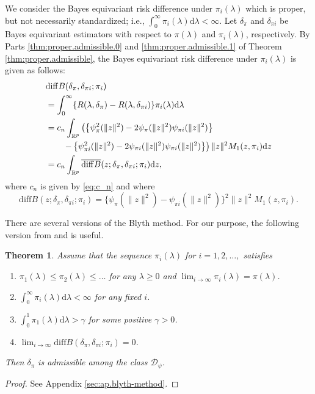 \documentclass[preprint,11pt]{imsart}
\numberwithin{equation}{section}
\theoremstyle{plain}
\newtheorem{thm}{Theorem}[section]
\theoremstyle{definition}
\theoremstyle{remark}
\newcommand{\rd}{\mathrm{d}}
\newcommand{\oldiff}{\overline{\mathrm{diff}B}}
\newcommand{\ndiff}{\mathrm{diff}B}
\newcommand{\dps}{\displaystyle}
\begin{document}
We consider the Bayes equivariant risk difference under $\pi_i(\lambda)$
which is proper, but not necessarily standardized; i.e., $\int_0^\infty \pi_i(\lambda) \rd \lambda <\infty$.
Let $\delta_\pi$ and $\delta_{\pi i}$ be Bayes equivariant estimators with respect to
$\pi(\lambda)$ and $\pi_i(\lambda)$, respectively.
By Parts \ref{thm:proper.admissible.0} and \ref{thm:proper.admissible.1} of Theorem \ref{thm:proper.admissible}, 
the Bayes equivariant risk difference under $\pi_i(\lambda)$ is given as follows:
\begin{align}
& \ndiff(\delta_\pi,\delta_{\pi i};\pi_i) \label{eq:ndiff}\\
 & =\int_0^\infty \{R(\lambda,\delta_\pi)-R(\lambda,\delta_{\pi i})\}\pi_i(\lambda) \rd \lambda \notag\\
 &=c_n\int_{\mathbb{R}^p}\left(\left\{\psi_{\pi}^2(\|z\|^2)
 -2\psi_{\pi}(\|z\|^2)\psi_{\pi i}(\|z\|^2)\right\} \right. \notag\\
 &\qquad \left. -
 \left\{\psi_{\pi i}^2(\|z\|^2)
 -2\psi_{\pi i}(\|z\|^2)\psi_{\pi i}(\|z\|^2)\right\}\right)\|z\|^2M_1(z,\pi_i) \rd z \notag \\
 &=c_n\int_{\mathbb{R}^p}\oldiff(z;\delta_\pi,\delta_{\pi i};\pi_i) \rd z,\notag
\end{align}
where $c_n$ is given by \eqref{eq:c_n} and where
\begin{equation}\label{eq:oldiff}
 \oldiff(z;\delta_\pi,\delta_{\pi i};\pi_i)
  =\{\psi_{\pi }(\|z\|^2)-\psi_{\pi i}(\|z\|^2)\}^2\|z\|^2M_1(z,\pi_i).
\end{equation}

There are several versions of the Blyth method. 
For our purpose, the following version from \cite{Brown-1971} and \cite{Brown-Hwang-1982}
 is useful.
\begin{thm}\label{blyth-method}
 Assume that the sequence $\pi_i(\lambda)$ for $i=1,2,\dots,$ 
 satisfies
\begin{enumerate}[label= BL.\arabic*]
\item \label{BL.-1}$\pi_1(\lambda)\leq \pi_2(\lambda)\leq \dots$  for any $\lambda\geq 0$ and $\lim_{i\to\infty}\pi_i(\lambda)=\pi(\lambda)$.
 \item \label{BL.0} $ \dps \int_0^\infty \pi_i(\lambda)\rd \lambda <\infty $ for any fixed $i$.
 \item \label{BL.1} $ \dps\int_0^1 \pi_{1}(\lambda)\rd \lambda >\gamma $ for some positive
       $\gamma>0$.
 \item \label{BL.2}$\dps \lim_{i\to\infty} \ndiff(\delta_\pi,\delta_{\pi i};\pi_i)=0$.
\end{enumerate}
 Then $ \delta_\pi$ is admissible among the class $\mathcal{D}_\psi$.
\end{thm}
\begin{proof}
 See Appendix \ref{sec:ap.blyth-method}.
\end{proof} 
\end{document}
